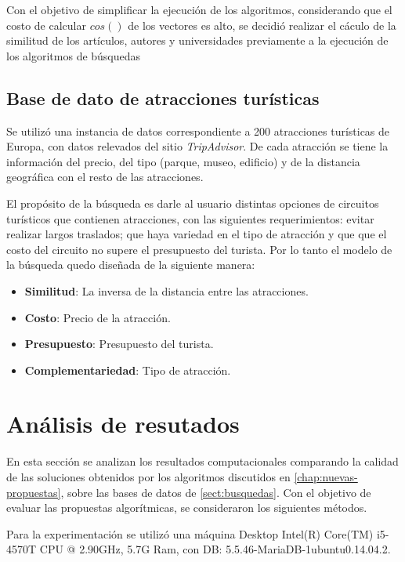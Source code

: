 Con el objetivo de simplificar la ejecución de los algoritmos, considerando que el costo de calcular $cos()$ de los vectores es alto, se decidió realizar el cáculo de la similitud de los artículos, autores y universidades previamente a la ejecución de los algoritmos de búsquedas

\subsection{Base de dato de atracciones turísticas}
Se utilizó una instancia de datos correspondiente a 200 atracciones turísticas de Europa, con datos relevados del sitio \textit{TripAdvisor}. De cada atracción se tiene la información del precio, del tipo (parque, museo, edificio) y de la distancia geográfica con el resto de las atracciones.

El propósito de la búsqueda es darle al usuario distintas opciones de circuitos turísticos que contienen atracciones, con las siguientes requerimientos: evitar realizar largos traslados; que haya variedad en el tipo de atracción y que que el costo del circuito no supere el presupuesto del turista. Por lo tanto el modelo de la búsqueda quedo diseñada de la siguiente manera: \label{busqueda:atracciones}

\begin{itemize}
	\item \textbf{Similitud}: La inversa de la distancia entre las atracciones. 
	\item \textbf{Costo}: Precio de la atracción. 
	\item \textbf{Presupuesto}: Presupuesto del turista. 
	\item \textbf{Complementariedad}: Tipo de atracción.
\end{itemize}

\section{Análisis de resutados}\label{sect:resultados}

En esta sección se analizan los resultados computacionales comparando la calidad de las soluciones obtenidos por los algoritmos discutidos en \autoref{chap:nuevas-propuestas}, sobre las bases de datos de \autoref{sect:busquedas}. Con el objetivo de evaluar las propuestas algorítmicas, se consideraron los siguientes métodos.

Para la experimentación se utilizó una máquina Desktop Intel(R) Core(TM) i5-4570T CPU @ 2.90GHz, 5.7G Ram, con DB: 5.5.46-MariaDB-1ubuntu0.14.04.2.

